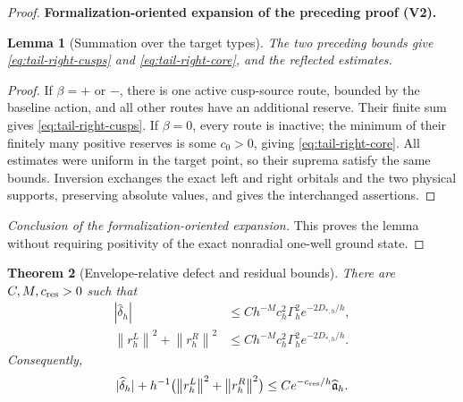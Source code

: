 \documentclass[11pt]{article}
\newtheorem{theorem}{Theorem}[section]
\newtheorem{lemma}[theorem]{Lemma}
\newcommand{\formalisationparentid}{X}
\newenvironment{formalisationaddition}[1]{\par\medskip\begingroup\color{blue}\def\formalisationparentid{#1}\setcounter{formalizationsublemma}{0}\let\lemma\formalizationsublemma\let\endlemma\endformalizationsublemma
  \def\Eo{\mathcal E_h^\circ}\def\EE{\mathcal E_h}\def\phio{\phi_h^\circ}\def\phih{\phi_h}\def\Ho{H_h^{\rm atom}(v^\circ)}\def\Ha{H_h^{\rm atom}}\def\HL{H_h^{L}}\def\Dh{D_h}\def\Log{\operatorname{Log}}\def\ellh{\ell_h}\def\Gp{G_{p,h}}\def\Ast{A_{*,h}}\def\ahat{\widehat{\mathfrak a}_h}\def\ah{\mathfrak a_h}\def\rh{\widehat\rho_h}\def\deltah{\widehat\delta_h}\def\oldref##1{\textup{(##1)}}\def\interface##1{\par\noindent\textit{Analytical interface used here.} ##1\par}\def\finish{\par\noindent\textit{Conclusion of the formalization-oriented expansion.} }\par\noindent\textbf{Formalization-oriented expansion of the preceding proof (V2).}\par\smallskip
}{\par\endgroup\medskip
}
\newcommand{\norm}[1]{\left\|#1\right\|}
\begin{document}
\begin{proof}
\begin{formalisationaddition}{L8.2}
\begin{lemma}[Summation over the target types]\label{sublemma:L8-2-targets}
The two preceding bounds give \eqref{eq:tail-right-cusps} and \eqref{eq:tail-right-core}, and the reflected estimates.
\end{lemma}
\begin{proof}
If $\beta=+$ or $-$, there is one active cusp-source route, bounded by the baseline action, and all other routes have an additional reserve. Their finite sum gives \eqref{eq:tail-right-cusps}. If $\beta=0$, every route is inactive; the minimum of their finitely many positive reserves is some $c_0>0$, giving \eqref{eq:tail-right-core}. All estimates were uniform in the target point, so their suprema satisfy the same bounds. Inversion exchanges the exact left and right orbitals and the two physical supports, preserving absolute values, and gives the interchanged assertions.
\end{proof}
\finish This proves the lemma without requiring positivity of the exact nonradial one-well ground state.
\end{formalisationaddition}

\end{proof}

\begin{theorem}[Envelope-relative defect and residual bounds]
\label{thm:defect-residual}
There are $C,M,c_{\rm res}>0$ such that
\begin{align}
 |\widehat\delta_h|
 &\le Ch^{-M}c_h^2\Gamma_h^2
 e^{-2D_{*,h}/h},
 \label{eq:delta-bound}\\
 \norm{r_h^L}^2+\norm{r_h^R}^2
 &\le Ch^{-M}c_h^2\Gamma_h^2
 e^{-2D_{*,h}/h}.
 \label{eq:residual-bound}
\end{align}
Consequently,
\begin{equation}\label{eq:defect-residual-relative}
 |\widehat\delta_h|
 +h^{-1}\bigl(\norm{r_h^L}^2+\norm{r_h^R}^2\bigr)
 \le Ce^{-c_{\rm res}/h}\widehat{\mathfrak a}_h.
\end{equation}
\end{theorem}
\end{document}
